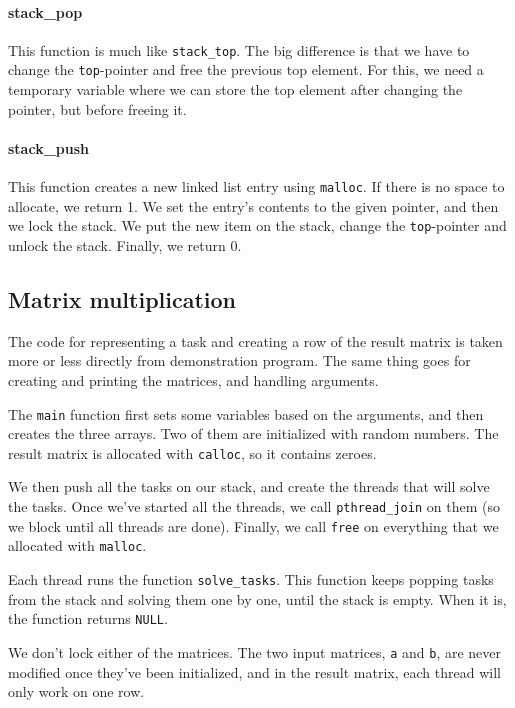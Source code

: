 \documentclass{article}
\begin{document}
\paragraph{stack\_pop}
This function is much like \texttt{stack\_top}. The big difference is that we have to change the \texttt{top}-pointer and free the previous top element. For this, we need a temporary variable where we can store the top element after changing the pointer, but before freeing it.

\paragraph{stack\_push}
This function creates a new linked list entry using \texttt{malloc}. If there is no space to allocate, we return 1. We set the entry's contents to the given pointer, and then we lock the stack. We put the new item on the stack, change the \texttt{top}-pointer and unlock the stack. Finally, we return 0.

\subsection{Matrix multiplication}
The code for representing a task and creating a row of the result matrix is taken more or less directly from demonstration program. The same thing goes for creating and printing the matrices, and handling arguments.

The \texttt{main} function first sets some variables based on the arguments, and then creates the three arrays. Two of them are initialized with random numbers. The result matrix is allocated with \texttt{calloc}, so it contains zeroes.

We then push all the tasks on our stack, and create the threads that will solve the tasks. Once we've started all the threads, we call \texttt{pthread\_join} on them (so we block until all threads are done). Finally, we call \texttt{free} on everything that we allocated with \texttt{malloc}.

Each thread runs the function \texttt{solve\_tasks}. This function keeps popping tasks from the stack and solving them one by one, until the stack is empty. When it is, the function returns \texttt{NULL}.

We don't lock either of the matrices. The two input matrices, \texttt{a} and \texttt{b}, are never modified once they've been initialized, and in the result matrix, each thread will only work on one row.
\end{document}
